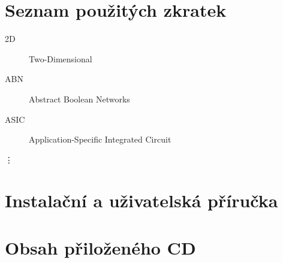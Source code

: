 \documentclass[11pt,twoside,a4paper]{book}
\begin{document}
\appendix


\chapter{Seznam použitých zkratek}

\begin{description}
\item[2D] Two-Dimensional
\item[ABN] Abstract Boolean Networks
\item[ASIC] Application-Specific Integrated Circuit
\end{description}
\vdots

\chapter{Instalační a uživatelská příručka}

\chapter{Obsah přiloženého CD}
\end{document}
